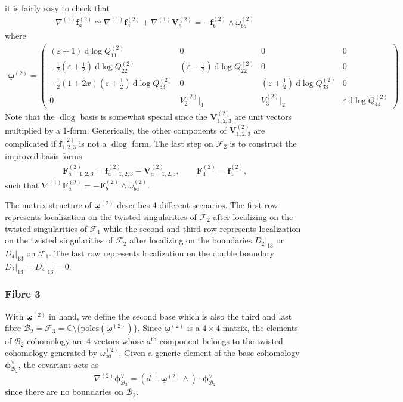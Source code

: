 \documentclass[11pt]{article}
\renewcommand{\d}{\text{d}}
\newcommand{\be}{\begin{equation}}
\newcommand{\ee}{\end{equation}}
\newcommand{\F}{\mathcal{F}}
\newcommand{\B}{\mathcal{B}}
\newcommand{\vep}{\varepsilon}
\newcommand{\bs}[1]{\boldsymbol{#1}}
\newcommand{\mat}[1]{\underline{\boldsymbol{#1}}}
\begin{document}
it is fairly easy to check that 
\begin{align}
	\nabla^{(1)} \bs{f}^{(2)}_a 
	\simeq \nabla^{(1)} \bs{f}^{(2)}_a + \nabla^{(1)} \bs{V}^{(2)}_a 
	= - \bs{f}^{(2)}_b \wedge \omega^{(2)}_{ba}
\end{align}
where 
\begin{align}
	\mat{\omega}^{(2)}
	=\begin{pmatrix}
		(\vep{+}1)\ \d\log Q^{(2)}_{11} & 0 & 0 & 0 
		\\
		-\frac12 (\vep{+}\frac12)\ \d\log Q^{(2)}_{22} & (\vep{+}\frac12)\ \d\log Q^{(2)}_{22} & 0 & 0 
		\\
		-\frac12 (1{+}2x) (\vep{+}\frac12)\ \d\log Q^{(2)}_{33} & 0 & (\vep{+}\frac12)\ \d\log Q^{(2)}_{33} & 0 
		\\
		0 & V^{(2)}_2\vert_4 & V^{(2)}_3\vert_2 & \vep\ \d\log Q^{(2)}_{44} 
	\end{pmatrix}
\end{align}
Note that the $\d\log$ basis is somewhat special since the $\bs{V}^{(2)}_{1,2,3}$ are unit vectors multiplied by a 1-form. Generically, the other components of $\bs{V}^{(2)}_{1,2,3}$ are complicated if $\bs{f}^{(2)}_{1,2,3}$ is not a $\d\log$ form. The last step on $\F_2$ is to construct the improved basis forms
\begin{align}
	\bs{F}^{(2)}_{a=1,2,3} = \bs{f}^{(2)}_{a=1,2,3} - \bs{V}^{(2)}_{a=1,2,3},
	\qquad 
	\bs{F}^{(2)}_{4} = \bs{f}^{(2)}_{4},
\end{align}
such that $\nabla^{(1)} \bs{F}^{(2)}_{a} = -\bs{F}^{(2)}_{b} \wedge \omega^{(2)}_{ba}$.

The matrix structure of $\mat{\omega}^{(2)}$ describes 4 different scenarios. The first row represents localization on the twisted singularities of $\F_2$ after localizing on the twisted singularities of $\F_1$ while the second and third row represents localization on the twisted singularities of $\F_2$ after localizing on the boundaries $D_2\vert_{13}$ or $D_4\vert_{13}$ on $\F_1$. The last row represents localization on the double boundary $D_2\vert_{13}=D_4\vert_{13}=0$. 

\subsubsection{Fibre 3}
With $\mat{\omega}^{(2)}$ in hand, we define the second base which is also the third and last fibre $\B_2 = \F_3 = \mathbb{C}\setminus\{\text{poles}(\mat{\omega}^{(2)})\}$. Since $\mat{\omega}^{(2)}$ is a $4\times4$ matrix, the elements of $\B_2$ cohomology are 4-vectors whose $a^\text{th}$-component belongs to the twisted cohomology generated by $\omega^{(2)}_{aa}$. Given a generic element of the base cohomology $\bs{\phi}^\vee_{\B_2}$, the covariant acts as
\be
 	\nabla^{(2)} \bs{\phi}^\vee_{\B_2} = (d + \mat{\omega}^{(2)} \wedge ) \cdot \bs{\phi}^\vee_{\B_2}
\ee
since there are no boundaries on $\B_2$. 
\end{document}

